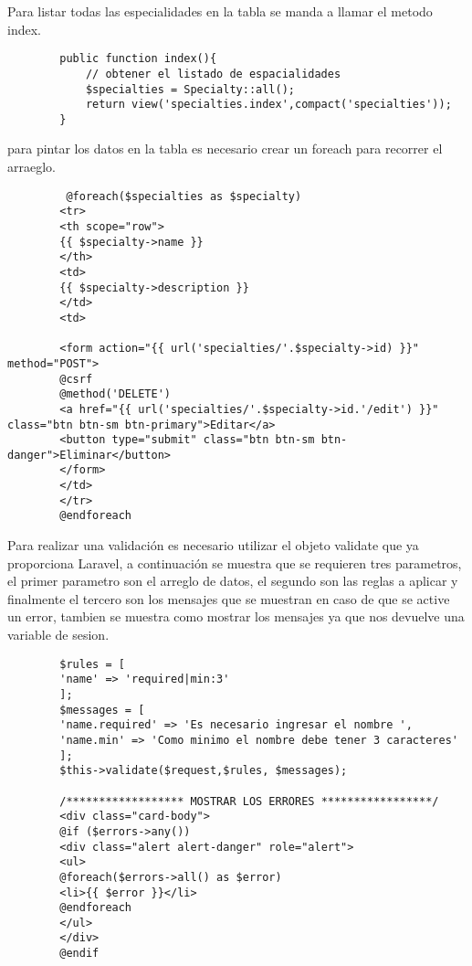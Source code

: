 \documentclass[a4paper]{article}
\begin{document}
	Para listar todas las especialidades en la tabla se manda a llamar el metodo index.
	
	\begin{lstlisting}
		public function index(){
			// obtener el listado de espacialidades
			$specialties = Specialty::all();
			return view('specialties.index',compact('specialties'));
		}
	\end{lstlisting} 

	para pintar los datos en la tabla es necesario crear un foreach para recorrer el arraeglo.
	
	\begin{lstlisting}
		 @foreach($specialties as $specialty)
		<tr>
		<th scope="row">
		{{ $specialty->name }}
		</th>
		<td>
		{{ $specialty->description }}
		</td>
		<td>
		
		<form action="{{ url('specialties/'.$specialty->id) }}" method="POST">
		@csrf
		@method('DELETE')
		<a href="{{ url('specialties/'.$specialty->id.'/edit') }}" class="btn btn-sm btn-primary">Editar</a>
		<button type="submit" class="btn btn-sm btn-danger">Eliminar</button>
		</form>
		</td>
		</tr>
		@endforeach
	\end{lstlisting} 
	
	
	Para realizar una validación es necesario utilizar el objeto validate que ya proporciona Laravel, a continuación se muestra que se requieren tres parametros, el primer parametro son el arreglo de datos, el segundo son las reglas a aplicar y finalmente el tercero son los mensajes que se muestran en caso de que se active un error, tambien se muestra como mostrar los mensajes ya que nos devuelve una variable de sesion.
	
	\begin{lstlisting}
		$rules = [
		'name' => 'required|min:3'
		];
		$messages = [
		'name.required' => 'Es necesario ingresar el nombre ',
		'name.min' => 'Como minimo el nombre debe tener 3 caracteres'
		];
		$this->validate($request,$rules, $messages); 
		
		/****************** MOSTRAR LOS ERRORES *****************/
		<div class="card-body">
		@if ($errors->any())
		<div class="alert alert-danger" role="alert">
		<ul>
		@foreach($errors->all() as $error)
		<li>{{ $error }}</li>
		@endforeach
		</ul>
		</div>
		@endif
	\end{lstlisting} 
\end{document}
